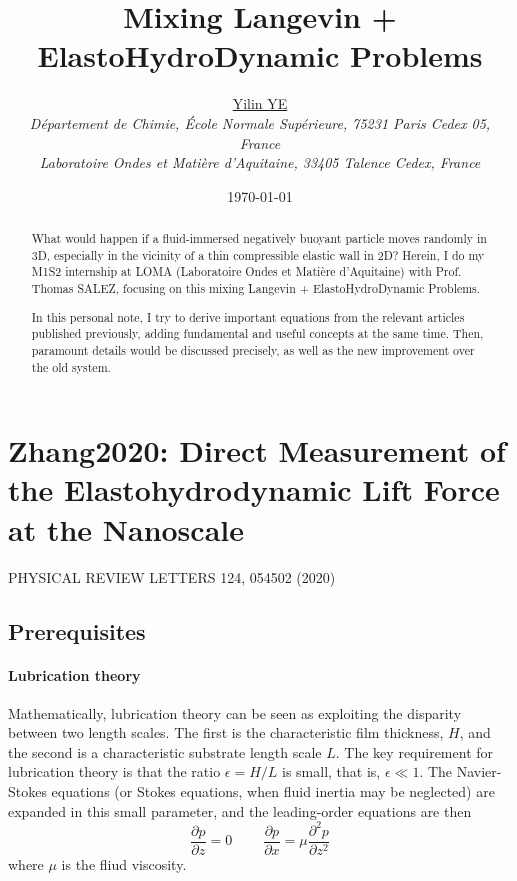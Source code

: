 \documentclass[books,12pt]{elegantpaper}
\title{\textcolor{ChimieBlue}{Mixing Langevin + ElastoHydroDynamic Problems}}
\author{\href{yilin.ye@ens.psl.eu}{{Yilin YE}}\\ \textit{\small{Département de Chimie, École Normale Supérieure, 75231 Paris Cedex 05, France}} \\ \textit{\small{Laboratoire Ondes et Matière d'Aquitaine, 33405 Talence Cedex, France}}}
\date{\today} %
\newcommand{\ssc}{\subsection}
\newcommand{\tens}{\ \ \ \ \ \ \ \ \ \ }
\begin{document}
\maketitle

\begin{abstract}
What would happen if a fluid-immersed negatively buoyant particle moves randomly in 3D, especially in the vicinity of a thin compressible elastic wall in 2D? Herein, I do my M1S2 internship at LOMA (Laboratoire Ondes et Matière d'Aquitaine) with Prof. Thomas SALEZ, focusing on this mixing Langevin + ElastoHydroDynamic Problems.

In this personal note, I try to derive important equations from the relevant articles published previously, adding fundamental and useful concepts at the same time. Then, paramount details would be discussed precisely, as well as the new improvement over the old system.
\end{abstract}
\tableofcontents %




\newpage
\setcounter{page}{1} %


\section{Zhang2020: Direct Measurement of the Elastohydrodynamic Lift Force at the Nanoscale}
PHYSICAL REVIEW LETTERS 124, 054502 (2020)


\ssc{Prerequisites}
\paragraph{Lubrication theory}
Mathematically, lubrication theory can be seen as exploiting the disparity between two length scales. The first is the characteristic film thickness, $H$, and the second is a characteristic substrate length scale $L$. The key requirement for lubrication theory is that the ratio $\epsilon=H/L$ is small, that is, $\epsilon\ll1$. The Navier-Stokes equations (or Stokes equations, when fluid inertia may be neglected) are expanded in this small parameter, and the leading-order equations are then
$$ \frac{\partial p}{\partial z} = 0 \tens \frac{\partial p}{\partial x} = \mu\frac{\partial^2 p}{\partial z^2} $$
where $\mu$ is the fliud viscosity.
\end{document}
